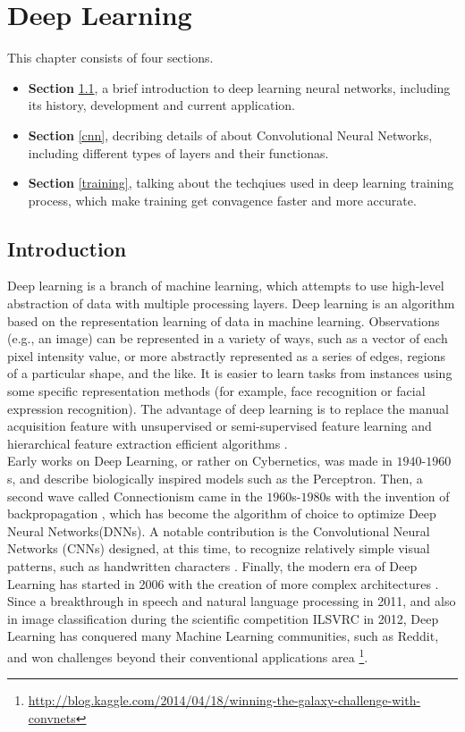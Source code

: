 \chapter{Deep Learning}
\label{cp:dp}
This chapter consists of four sections. 
\begin{itemize}
    \item \textbf{Section} \ref{dpintro}, a brief introduction to deep learning neural networks, including its history, development and current application.
    \item \textbf{Section} \ref{cnn}, decribing details of about Convolutional Neural Networks, including different types of layers and their functionas.
    \item \textbf{Section} \ref{training}, talking about the techqiues used in deep learning training process, which make training get convagence faster and more accurate.  
\end{itemize} 

\section{Introduction}
    \label{dpintro}
    Deep learning is a branch of machine learning, which attempts to use high-level abstraction of data with multiple processing layers. Deep learning is an algorithm based on the representation learning of data in machine learning. Observations (e.g., an image) can be represented in a variety of ways, such as a vector of each pixel intensity value, or more abstractly represented as a series of edges, regions of a particular shape, and the like. It is easier to learn tasks from instances using some specific representation methods (for example, face recognition or facial expression recognition). The advantage of deep learning is to replace the manual acquisition feature with unsupervised or semi-supervised feature learning and hierarchical feature extraction efficient algorithms \cite{schmidhuber2015deep}. \\

    Early works on Deep Learning, or rather on Cybernetics, was made in $1940$-$1960$s, and describe biologically inspired models such as the Perceptron\cite{rosenblatt2000probabilistic,schmidhuber2015deep}. Then, a second wave called Connectionism came in the $1960$s-$1980$s with the invention of backpropagation \cite{rumelhart1986learning}, which has become the algorithm of choice to optimize Deep Neural Networks(DNNs). A notable contribution is the Convolutional Neural Networks (CNNs) designed, at this time, to recognize relatively simple visual patterns, such as handwritten characters \cite{lecun1995convolutional}. Finally, the modern era of Deep Learning has started in 2006 with the creation of more complex architectures \cite{hinton2006fast,bengio2007greedy,huang2007unsupervised}. Since a breakthrough in speech and natural language processing in 2011, and also in image classification during the scientific competition ILSVRC in 2012, Deep Learning has conquered many Machine Learning communities, such as Reddit, and won challenges beyond their conventional applications area \footnote{\url{http://blog.kaggle.com/2014/04/18/winning-the-galaxy-challenge-with-convnets}}. \\

